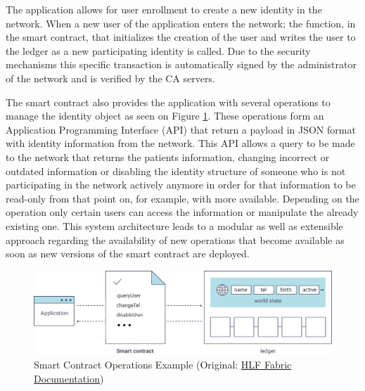 The application allows for user enrollment to create a new identity in the
network.  When a new user of the application enters the network; the function,
in the smart contract, that initializes the creation of the user and writes the
user to the ledger as a new participating identity is called. Due to the
security mechanisms this specific transaction is automatically signed by the
administrator of the network and is verified by the CA servers.

The smart contract also provides the application with several operations to
manage the identity object as seen on Figure \ref{fig:smartContractOverview}.
These operations form an Application Programming Interface (API) that return a
payload in JSON format with identity information from the network.  This API
allows a query to be made to the network that returns the patients information,
changing incorrect or outdated information or disabling the identity structure
of someone who is not participating in the network actively anymore in order
for that information to be read-only from that point on, for example, with more
available.  Depending on the operation only certain users can access the
information or manipulate the already existing one.  This system architecture
leads to a modular as well as extensible approach regarding the availability of
new operations that become available as soon as new versions of the smart
contract are deployed.  

\begin{figure}[ht] 
  \centering
  \includegraphics[width=1\linewidth]{imgs/smartContractOverview.png}
  \caption{\label{fig:smartContractOverview}Smart Contract Operations Example
  (Original:
  \href{http://hyperledger-fabric.readthedocs.io/en/latest/write_first_app.html}{HLF
  Fabric Documentation})} 
\end{figure}
